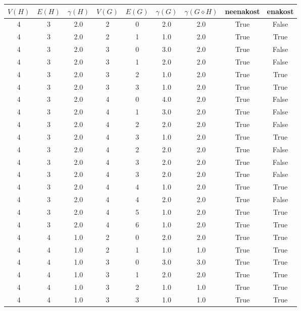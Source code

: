 \documentclass[a4paper,12pt]{article}
\begin{document}
\begin{center}
    \begin{tabular}{ c c c | c c c | c | c | c}
        $V(H)$ & $E(H)$ & $\gamma(H)$ & $V(G)$ & $E(G)$ & $\gamma(G)$ & $\gamma(G \diamond H)$ & neenakost & enakost \\
        \hline
        4 & 3 & 2.0 & 2 & 0 & 2.0 & 2.0 & True & False    \\
        4 & 3 & 2.0 & 2 & 1 & 1.0 & 2.0 & True & True     \\
        4 & 3 & 2.0 & 3 & 0 & 3.0 & 2.0 & True & False    \\
        4 & 3 & 2.0 & 3 & 1 & 2.0 & 2.0 & True & False    \\
        4 & 3 & 2.0 & 3 & 2 & 1.0 & 2.0 & True & True     \\
        4 & 3 & 2.0 & 3 & 3 & 1.0 & 2.0 & True & True     \\
        4 & 3 & 2.0 & 4 & 0 & 4.0 & 2.0 & True & False    \\
        4 & 3 & 2.0 & 4 & 1 & 3.0 & 2.0 & True & False    \\
        4 & 3 & 2.0 & 4 & 2 & 2.0 & 2.0 & True & False    \\
        4 & 3 & 2.0 & 4 & 3 & 1.0 & 2.0 & True & True     \\
        4 & 3 & 2.0 & 4 & 2 & 2.0 & 2.0 & True & False    \\
        4 & 3 & 2.0 & 4 & 3 & 2.0 & 2.0 & True & False    \\
        4 & 3 & 2.0 & 4 & 3 & 2.0 & 2.0 & True & False    \\
        4 & 3 & 2.0 & 4 & 4 & 1.0 & 2.0 & True & True     \\
        4 & 3 & 2.0 & 4 & 4 & 2.0 & 2.0 & True & False    \\
        4 & 3 & 2.0 & 4 & 5 & 1.0 & 2.0 & True & True     \\
        4 & 3 & 2.0 & 4 & 6 & 1.0 & 2.0 & True & True     \\
        4 & 4 & 1.0 & 2 & 0 & 2.0 & 2.0 & True & True     \\
        4 & 4 & 1.0 & 2 & 1 & 1.0 & 1.0 & True & True     \\
        4 & 4 & 1.0 & 3 & 0 & 3.0 & 3.0 & True & True     \\
        4 & 4 & 1.0 & 3 & 1 & 2.0 & 2.0 & True & True     \\
        4 & 4 & 1.0 & 3 & 2 & 1.0 & 1.0 & True & True     \\
        4 & 4 & 1.0 & 3 & 3 & 1.0 & 1.0 & True & True     \\

\end{tabular}
\end{center}
\end{document}

